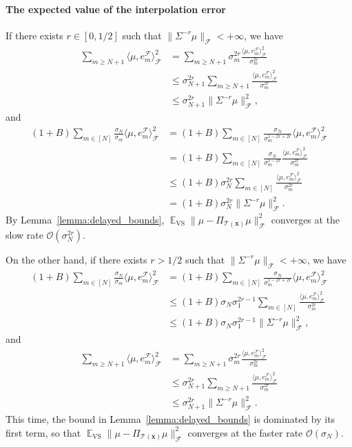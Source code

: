 \documentclass[twoside,11pt]{book}
\DeclareMathOperator{\VS}{\mathrm{VS}}
\DeclareMathOperator{\EX}{\mathbb{E}}
\DeclareMathOperator{\F}{\mathcal{F}}
\begin{document}
\paragraph{The expected value of the interpolation error}
If there exists $r \in [0,1/2]$ such that $\displaystyle \| \Sigma^{-r} \mu \|_{\F} < +\infty$, we have
\begin{align}
\sum\limits_{m \geq N+1} \langle \mu,e_{m}^{\F} \rangle_{\F}^{2}
& = \sum\limits_{m \geq N+1} \sigma_{m}^{2r} \frac{ \langle \mu,e_{m}^{\F} \rangle_{\F}^{2}}{\sigma_{m}^{2r}} \\
& \leq \sigma_{N+1}^{2r} \sum\limits_{m \geq N+1} \frac{ \langle \mu,e_{m}^{\F} \rangle_{\F}^{2}}{\sigma_{m}^{2r}} \\
& \leq \sigma_{N+1}^{2r} \|\Sigma^{-r} \mu\|_{\F}^{2},
\end{align}
and
\begin{align}
(1+B) \sum\limits_{m \in [N]} \frac{\sigma_{N}}{\sigma_{m}} \langle \mu,e_{m}^{\F} \rangle_{\F}^{2}
& = (1+B) \sum\limits_{m \in [N]} \frac{\sigma_{N}}{\sigma_{m}^{1-2r+2r}} \langle \mu,e_{m}^{\F} \rangle_{\F}^{2} \\
& = (1+B) \sum\limits_{m \in [N]} \frac{\sigma_{N}}{\sigma_{m}^{1-2r}} \frac{\langle \mu,e_{m}^{\F} \rangle_{\F}^{2}}{\sigma_{m}^{2r}} \\
& \leq (1+B) \sigma_{N}^{2r} \sum\limits_{m \in [N]} \frac{\langle \mu,e_{m}^{\F} \rangle_{\F}^{2}}{\sigma_{m}^{2r}} \\
& = (1+B) \sigma_{N}^{2r} \|\Sigma^{-r} \mu\|_{\F}^{2}.
\end{align}
By Lemma~\ref{lemma:delayed_bounds}, $\displaystyle \EX_{\VS}\| \mu - \Pi_{\mathcal{T}(\bm{x})} \mu \|_{\F}^{2}$ converges at the slow rate $\mathcal{O}(\sigma_{N}^{2r})$.

On the other hand, if there exists $r > 1/2$ such that $\displaystyle \| \Sigma^{-r} \mu \|_{\F} < +\infty$, we have
\begin{align}
(1+B) \sum\limits_{m \in [N]} \frac{\sigma_{N}}{\sigma_{m}} \langle \mu,e_{m}^{\F} \rangle_{\F}^{2}
& = (1+B) \sum\limits_{m \in [N]} \frac{\sigma_{N}}{\sigma_{m}^{1-2r+2r}} \langle \mu,e_{m}^{\F} \rangle_{\F}^{2} \\
& \leq (1+B) \sigma_{N} \sigma_{1}^{2r-1} \sum\limits_{m \in [N]} \frac{\langle \mu,e_{m}^{\F} \rangle_{\F}^{2}}{\sigma_{m}^{2r}} \\
&  \leq (1+B) \sigma_{N} \sigma_{1}^{2r-1} \|\Sigma^{-r} \mu\|_{\F}^{2},
\end{align}
and
\begin{align}
\sum\limits_{m \geq N+1} \langle \mu,e_{m}^{\F} \rangle_{\F}^{2}
& = \sum\limits_{m \geq N+1} \sigma_{m}^{2r} \frac{ \langle \mu,e_{m}^{\F} \rangle_{\F}^{2}}{\sigma_{m}^{2r}} \\
& \leq \sigma_{N+1}^{2r} \sum\limits_{m \geq N+1} \frac{ \langle \mu,e_{m}^{\F} \rangle_{\F}^{2}}{\sigma_{m}^{2r}} \\
& \leq \sigma_{N+1}^{2r} \|\Sigma^{-r} \mu\|_{\F}^{2}.
\end{align}
This time, the bound in Lemma~\ref{lemma:delayed_bounds} is dominated by its first term, so that $\displaystyle \EX_{\VS}\| \mu - \Pi_{\mathcal{T}(\bm{x})} \mu \|_{\F}^{2}$ converges at the faster rate $\mathcal{O}(\sigma_{N})$.
\end{document}
